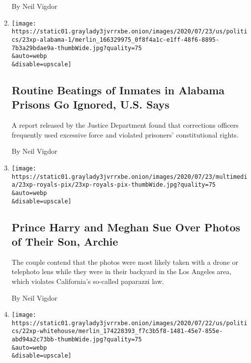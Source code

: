 \begin{enumerate}
  By Neil Vigdor
\item
  \href{/2020/07/24/us/alabama-prisons-excessive-force.html}{}

  \texttt{[image: https://static01.graylady3jvrrxbe.onion/images/2020/07/23/us/politics/23xp-alabama-1/merlin\_166329975\_0f8f4a1c-e1ff-48f6-8895-7b3a29bdae9a-thumbWide.jpg?quality=75\\\&auto=webp\\\&disable=upscale]}

  \hypertarget{routine-beatings-of-inmates-in-alabama-prisons-go-ignored-us-says}{%
  \subsection{Routine Beatings of Inmates in Alabama Prisons Go Ignored,
  U.S.
  Says}\label{routine-beatings-of-inmates-in-alabama-prisons-go-ignored-us-says}}

  A report released by the Justice Department found that corrections
  officers frequently used excessive force and violated prisoners'
  constitutional rights.

  By Neil Vigdor
\item
  \href{/2020/07/23/us/meghan-harry-paparazzi.html}{}

  \texttt{[image: https://static01.graylady3jvrrxbe.onion/images/2020/07/23/multimedia/23xp-royals-pix/23xp-royals-pix-thumbWide.jpg?quality=75\\\&auto=webp\\\&disable=upscale]}

  \hypertarget{prince-harry-and-meghan-sue-over-photos-of-their-son-archie}{%
  \subsection{Prince Harry and Meghan Sue Over Photos of Their Son,
  Archie}\label{prince-harry-and-meghan-sue-over-photos-of-their-son-archie}}

  The couple contend that the photos were most likely taken with a drone
  or telephoto lens while they were in their backyard in the Los Angeles
  area, which violates California's so-called paparazzi law.

  By Neil Vigdor
\item
  \href{/2020/07/22/us/politics/white-house-employee-covid-19.html}{}

  \texttt{[image: https://static01.graylady3jvrrxbe.onion/images/2020/07/22/us/politics/22xp-whitehouse/merlin\_174228393\_f7c3b5f8-1481-45e7-855e-abd94a2c73bb-thumbWide.jpg?quality=75\\\&auto=webp\\\&disable=upscale]}

  \hypertarget{2-cafeterias-used-by-white-house-staff-close-after-employee-contracts-the-virus}{%
}
\end{enumerate}
